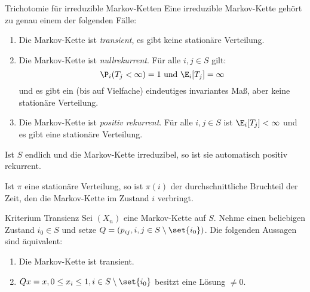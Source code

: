 \begin{karte}{Trichotomie für irreduzible Markov-Ketten}
    Eine irreduzible Markov-Kette gehört zu genau einem der folgenden Fälle:
    \begin{enumerate}
        \item Die Markov-Kette ist \textit{transient}, es gibt keine stationäre Verteilung.
        \item Die Markov-Kette ist \textit{nullrekurrent}. Für alle \(i,j\in S\) gilt:
        \[ \P_i(T_j < \infty) = 1 \text{ und } \E_i[T_j] = \infty \]
        und es gibt ein (bis auf Vielfache) eindeutiges invariantes Maß, aber keine stationäre Verteilung.
        \item Die Markov-Kette ist \textit{positiv rekurrent}. Für alle \(i,j\in S\) 
        ist \(\E_i[T_j] < \infty\) und es gibt eine stationäre Verteilung.
    \end{enumerate}

    Ist \(S\) endlich und die Markov-Kette irreduzibel, so ist sie automatisch positiv rekurrent.

    Ist \(\pi\) eine stationäre Verteilung, 
    so ist \(\pi(i)\) der durchschnittliche Bruchteil der Zeit, 
    den die Markov-Kette im Zustand \(i\) verbringt.
\end{karte}

\begin{karte}{Kriterium Transienz}
    Sei \((X_n)\) eine Markov-Kette auf \(S\). 
    Nehme einen beliebigen Zustand \(i_0 \in S\) und setze
    \(Q = (p_{ij}, i,j\in S \setminus\set{i_0})\).
    Die folgenden Aussagen sind äquivalent:
    \begin{enumerate}
        \item Die Markov-Kette ist transient.
        \item \(Qx = x, 0 \leq x_i \leq 1, i \in S\setminus\set{i_0}\) 
        besitzt eine Lösung \(\neq 0\).
    \end{enumerate}
\end{karte}